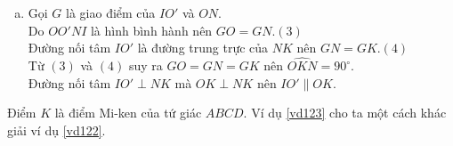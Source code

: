 \begin{vd}
{\begin{enumerate}[a)]
{\\
				\centering \textbf{Hình 150}}
			\item Gọi $G$ là giao điểm của $IO'$ và $ON$. \\
			Do $OO'NI$ là hình bình hành nên $GO=GN$.\hfill$(3)$\\
			Đường nối tâm $IO'$ là đường trung trực của $NK$ nên $GN=GK$.\hfill$(4)$\\
			Từ $(3)$ và $(4)$ suy ra $GO=GN=GK$ nên $\widehat{OKN}=90^{\circ}$.\\
			Đường nối tâm $IO'\perp NK$ mà $OK\perp NK$ nên $IO'\parallel OK$.
		\end{enumerate}
 Điểm $K$ là điểm Mi-ken của tứ giác $ABCD$. Ví dụ \ref{vd123} cho ta một cách khác giải ví dụ \ref{vd122}.
	}
	
\end{vd}
